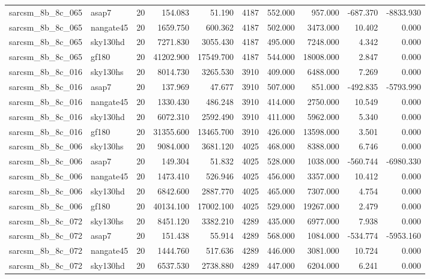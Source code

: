 \documentclass{article}
\begin{document}
\begin{longtable}{llrrrrrrrr}
sarcsm\_8b\_8c\_065 & asap7 & 20 & 154.083 & 51.190 & 4187 & 552.000 & 957.000 & -687.370 & -8833.930 \\
sarcsm\_8b\_8c\_065 & nangate45 & 20 & 1659.750 & 600.362 & 4187 & 502.000 & 3473.000 & 10.402 & 0.000 \\
sarcsm\_8b\_8c\_065 & sky130hd & 20 & 7271.830 & 3055.430 & 4187 & 495.000 & 7248.000 & 4.342 & 0.000 \\
sarcsm\_8b\_8c\_065 & gf180 & 20 & 41202.900 & 17549.700 & 4187 & 544.000 & 18008.000 & 2.847 & 0.000 \\
sarcsm\_8b\_8c\_016 & sky130hs & 20 & 8014.730 & 3265.530 & 3910 & 409.000 & 6488.000 & 7.269 & 0.000 \\
sarcsm\_8b\_8c\_016 & asap7 & 20 & 137.969 & 47.677 & 3910 & 507.000 & 851.000 & -492.835 & -5793.990 \\
sarcsm\_8b\_8c\_016 & nangate45 & 20 & 1330.430 & 486.248 & 3910 & 414.000 & 2750.000 & 10.549 & 0.000 \\
sarcsm\_8b\_8c\_016 & sky130hd & 20 & 6072.310 & 2592.490 & 3910 & 411.000 & 5962.000 & 5.340 & 0.000 \\
sarcsm\_8b\_8c\_016 & gf180 & 20 & 31355.600 & 13465.700 & 3910 & 426.000 & 13598.000 & 3.501 & 0.000 \\
sarcsm\_8b\_8c\_006 & sky130hs & 20 & 9084.000 & 3681.120 & 4025 & 468.000 & 8388.000 & 6.746 & 0.000 \\
sarcsm\_8b\_8c\_006 & asap7 & 20 & 149.304 & 51.832 & 4025 & 528.000 & 1038.000 & -560.744 & -6980.330 \\
sarcsm\_8b\_8c\_006 & nangate45 & 20 & 1473.410 & 526.946 & 4025 & 456.000 & 3357.000 & 10.412 & 0.000 \\
sarcsm\_8b\_8c\_006 & sky130hd & 20 & 6842.600 & 2887.770 & 4025 & 465.000 & 7307.000 & 4.754 & 0.000 \\
sarcsm\_8b\_8c\_006 & gf180 & 20 & 40134.100 & 17002.100 & 4025 & 529.000 & 19267.000 & 2.479 & 0.000 \\
sarcsm\_8b\_8c\_072 & sky130hs & 20 & 8451.120 & 3382.210 & 4289 & 435.000 & 6977.000 & 7.938 & 0.000 \\
sarcsm\_8b\_8c\_072 & asap7 & 20 & 151.438 & 55.914 & 4289 & 568.000 & 1084.000 & -534.774 & -5953.160 \\
sarcsm\_8b\_8c\_072 & nangate45 & 20 & 1444.760 & 517.636 & 4289 & 446.000 & 3081.000 & 10.724 & 0.000 \\
sarcsm\_8b\_8c\_072 & sky130hd & 20 & 6537.530 & 2738.880 & 4289 & 447.000 & 6204.000 & 6.241 & 0.000 \\

\end{longtable}
\end{document}
